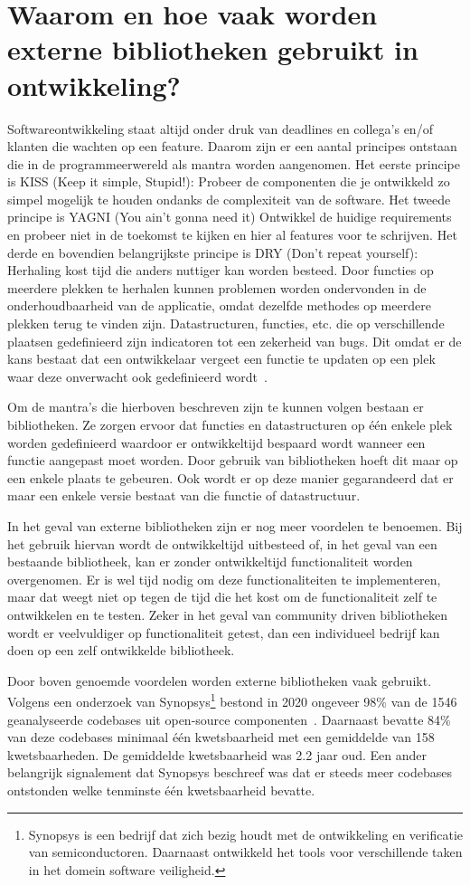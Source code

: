 \section{Waarom en hoe vaak worden externe bibliotheken gebruikt in ontwikkeling?}\label{sec:waarom-hoe}
Softwareontwikkeling staat altijd onder druk van deadlines en collega's en/of klanten die wachten op een feature. Daarom zijn er een aantal principes ontstaan die in de programmeerwereld als mantra worden aangenomen. Het eerste principe is KISS (Keep it simple, Stupid!): Probeer de componenten die je ontwikkeld zo simpel mogelijk te houden ondanks de complexiteit van de software. Het tweede principe is YAGNI (You ain't gonna need it) Ontwikkel de huidige requirements en probeer niet in de toekomst te kijken en hier al features voor te schrijven. Het derde en bovendien belangrijkste principe is DRY (Don't repeat yourself): Herhaling kost tijd die anders nuttiger kan worden besteed. Door functies op meerdere plekken te herhalen kunnen problemen worden ondervonden in de onderhoudbaarheid van de applicatie, omdat dezelfde methodes op meerdere plekken terug te vinden zijn. Datastructuren, functies, etc. die op verschillende plaatsen gedefinieerd zijn indicatoren tot een zekerheid van bugs. Dit omdat er de kans bestaat dat een ontwikkelaar vergeet een functie te updaten op een plek waar deze onverwacht ook gedefinieerd wordt~\citep{Papadopoulo:2021}.

Om de mantra's die hierboven beschreven zijn te kunnen volgen bestaan er bibliotheken. Ze zorgen ervoor dat functies en datastructuren op één enkele plek worden gedefinieerd waardoor er ontwikkeltijd bespaard wordt wanneer een functie aangepast moet worden. Door gebruik van bibliotheken hoeft dit maar op een enkele plaats te gebeuren. Ook wordt er op deze manier gegarandeerd dat er maar een enkele versie bestaat van die functie of datastructuur.

In het geval van externe bibliotheken zijn er nog meer voordelen te benoemen. Bij het gebruik hiervan wordt de ontwikkeltijd uitbesteed of, in het geval van een bestaande bibliotheek, kan er zonder ontwikkeltijd functionaliteit worden overgenomen. Er is wel tijd nodig om deze functionaliteiten te implementeren, maar dat weegt niet op tegen de tijd die het kost om de functionaliteit zelf te ontwikkelen en te testen. Zeker in het geval van community driven bibliotheken wordt er veelvuldiger op functionaliteit getest, dan een individueel bedrijf kan doen op een zelf ontwikkelde bibliotheek.

Door boven genoemde voordelen worden externe bibliotheken vaak gebruikt. Volgens een onderzoek van Synopsys\footnote{Synopsys is een bedrijf dat zich bezig houdt met de ontwikkeling en verificatie van semiconductoren. Daarnaast ontwikkeld het tools voor verschillende taken in het domein software veiligheid.} bestond in 2020 ongeveer 98\% van de 1546 geanalyseerde codebases uit open-source componenten~\citep{Synopsys:2021}. Daarnaast bevatte 84\% van deze codebases minimaal één kwetsbaarheid met een gemiddelde van 158 kwetsbaarheden. De gemiddelde kwetsbaarheid was 2.2 jaar oud. Een ander belangrijk signalement dat Synopsys beschreef was dat er steeds meer codebases ontstonden welke tenminste één kwetsbaarheid bevatte.

